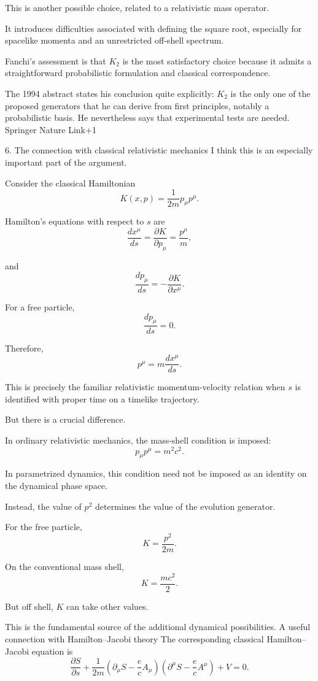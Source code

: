 This is another possible choice, related to a relativistic mass operator.

It introduces difficulties associated with defining the square root, especially for spacelike momenta and an unrestricted off-shell spectrum.

Fanchi's assessment is that \(K_2\) is the most satisfactory choice because it admits a straightforward probabilistic formulation and classical correspondence.

The 1994 abstract states his conclusion quite explicitly: \(K_2\) is the only one of the proposed generators that he can derive from first principles, notably a probabilistic basis. He nevertheless says that experimental tests are needed. 
Springer Nature Link+1


6. The connection with classical relativistic mechanics
I think this is an especially important part of the argument.

Consider the classical Hamiltonian
\[
K(x,p)=\frac{1}{2m}p_\mu p^\mu.
\tag{17}
\]

Hamilton's equations with respect to \(s\) are
\[
\frac{dx^\mu}{ds}
=
\frac{\partial K}{\partial p_\mu}
=
\frac{p^\mu}{m},
\tag{18}
\]

and
\[
\frac{dp_\mu}{ds}
=
-\frac{\partial K}{\partial x^\mu}.
\tag{19}
\]

For a free particle,
\[
\frac{dp_\mu}{ds}=0.
\]

Therefore,
\[
p^\mu=m\frac{dx^\mu}{ds}.
\tag{20}
\]

This is precisely the familiar relativistic momentum-velocity relation when \(s\) is identified with proper time on a timelike trajectory.

But there is a crucial difference.

In ordinary relativistic mechanics, the mass-shell condition is imposed:
\[
p_\mu p^\mu=m^2c^2.
\tag{21}
\]

In parametrized dynamics, this condition need not be imposed as an identity on the dynamical phase space.

Instead, the value of \(p^2\) determines the value of the evolution generator.

For the free particle,
\[
K=\frac{p^2}{2m}.
\]

On the conventional mass shell,
\[
K=\frac{mc^2}{2}.
\]

But off shell, \(K\) can take other values.

This is the fundamental source of the additional dynamical possibilities.
A useful connection with Hamilton–Jacobi theory
The corresponding classical Hamilton–Jacobi equation is
\[
\frac{\partial S}{\partial s}
+
\frac{1}{2m}
\left(
\partial_\mu S-\frac ec A_\mu
\right)
\left(
\partial^\mu S-\frac ec A^\mu
\right)
+V=0.
\tag{22}
\]

